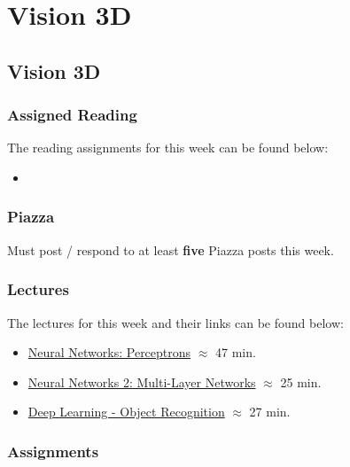 \clearpage

\renewcommand{\ChapTitle}{Vision 3D}
\renewcommand{\SectionTitle}{Vision 3D}

\chapter{\ChapTitle}
\section{\SectionTitle}

\subsection{Assigned Reading}

The reading assignments for this week can be found below:

\begin{itemize}
    \item {}
\end{itemize}

\subsection{Piazza}

Must post / respond to at least \textbf{five} Piazza posts this week.  

\subsection{Lectures}

The lectures for this week and their links can be found below:

\begin{itemize}
    \item \href{https://www.youtube.com/watch?v=XAN8u7voWw0}{Neural Networks: Perceptrons} $\approx$ 47 min.
    \item \href{https://www.youtube.com/watch?v=zAXDn4zGXxs}{Neural Networks 2: Multi-Layer Networks} $\approx$ 25 min.
    \item \href{https://www.youtube.com/watch?v=zttSZyM8HPI}{Deep Learning - Object Recognition} $\approx$ 27 min.
\end{itemize}

\subsection{Assignments}

